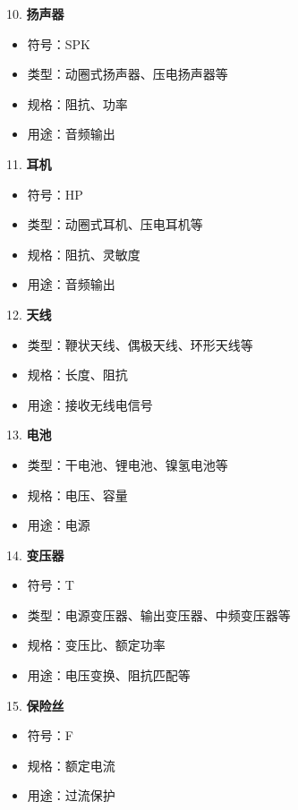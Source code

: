 \documentclass[12pt,UTF8]{ctexbook}
\begin{document}
10. \textbf{扬声器}
    \begin{itemize}[leftmargin=3.5em]
    \item 符号：SPK
    \item 类型：动圈式扬声器、压电扬声器等
    \item 规格：阻抗、功率
    \item 用途：音频输出
    \end{itemize}

11. \textbf{耳机}
    \begin{itemize}[leftmargin=3.5em]
    \item 符号：HP
    \item 类型：动圈式耳机、压电耳机等
    \item 规格：阻抗、灵敏度
    \item 用途：音频输出
    \end{itemize}

12. \textbf{天线}
    \begin{itemize}[leftmargin=3.5em]
    \item 类型：鞭状天线、偶极天线、环形天线等
    \item 规格：长度、阻抗
    \item 用途：接收无线电信号
    \end{itemize}

13. \textbf{电池}
    \begin{itemize}[leftmargin=3.5em]
    \item 类型：干电池、锂电池、镍氢电池等
    \item 规格：电压、容量
    \item 用途：电源
    \end{itemize}

14. \textbf{变压器}
    \begin{itemize}[leftmargin=3.5em]
    \item 符号：T
    \item 类型：电源变压器、输出变压器、中频变压器等
    \item 规格：变压比、额定功率
    \item 用途：电压变换、阻抗匹配等
    \end{itemize}

15. \textbf{保险丝}
    \begin{itemize}[leftmargin=3.5em]
    \item 符号：F
    \item 规格：额定电流
    \item 用途：过流保护
    \end{itemize}
\end{document}
